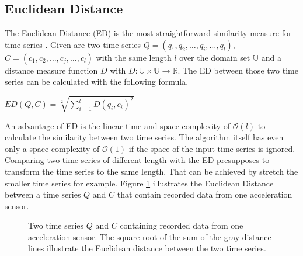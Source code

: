 \subsection{Euclidean Distance} \label{euclidean_distance}
The Euclidean Distance (ED) is the most straightforward similarity measure for time series \cite{ding2008querying}.
Given are two time series $Q = (q_1, q_2, \dots, q_i, \dots, q_l)$, $C = (c_1, c_2, \dots, c_j, \dots, c_l)$ with the
same length $l$ over the domain set $\mathbb{U}$ and a distance measure function $D$ with
$D: \mathbb{U} \times \mathbb{U} \to \mathbb{R}$. The ED between those two time series can be calculated with the
following formula.

\begin{center}
    $ED(Q, C) = \sqrt[2]{\sum \limits_{i=1}^{l} D(q_i, c_i)^2}$
\end{center}

An advantage of ED is the linear time and space complexity of $\mathcal{O}(l)$ to calculate the similarity between two
time series. The algorithm itself has even only a space complexity of $\mathcal{O}(1)$ if the space of the input time
series is ignored. Comparing two time series of different length with the ED presupposes to transform the time series
to the same length. That can be achieved by stretch the smaller time series for example. Figure
\ref{fig:euclideandistance} illustrates the Euclidean Distance between a time series $Q$ and $C$ that contain recorded
data from one acceleration sensor.

\begin{figure}[H]
    \begin{center}
    \end{center}
    \caption{Two time series $Q$ and $C$ containing recorded data from one acceleration sensor. The square root of the
    sum of the gray distance lines illustrate the Euclidean distance between the two time series.}
    \label{fig:euclideandistance}
\end{figure}
